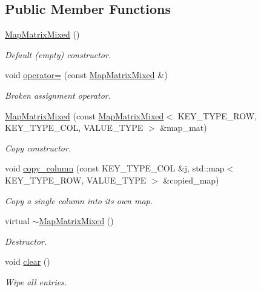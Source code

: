 \subsection*{Public Member Functions}
\begin{DoxyCompactItemize}
\item 
\hyperlink{classoomph_1_1MapMatrixMixed_a51d284e72805320fe36239f5d33e2973}{Map\+Matrix\+Mixed} ()
\begin{DoxyCompactList}\small\item\em Default (empty) constructor. \end{DoxyCompactList}\item 
void \hyperlink{classoomph_1_1MapMatrixMixed_a5a52484fc1b32bcbda6a198de2bd83cb}{operator=} (const \hyperlink{classoomph_1_1MapMatrixMixed}{Map\+Matrix\+Mixed} \&)
\begin{DoxyCompactList}\small\item\em Broken assignment operator. \end{DoxyCompactList}\item 
\hyperlink{classoomph_1_1MapMatrixMixed_ae510212b296340607ddce4083b3ed36a}{Map\+Matrix\+Mixed} (const \hyperlink{classoomph_1_1MapMatrixMixed}{Map\+Matrix\+Mixed}$<$ K\+E\+Y\+\_\+\+T\+Y\+P\+E\+\_\+\+R\+OW, K\+E\+Y\+\_\+\+T\+Y\+P\+E\+\_\+\+C\+OL, V\+A\+L\+U\+E\+\_\+\+T\+Y\+PE $>$ \&map\+\_\+mat)
\begin{DoxyCompactList}\small\item\em Copy constructor. \end{DoxyCompactList}\item 
void \hyperlink{classoomph_1_1MapMatrixMixed_a2cd31cfd9771420625c92fc2a3a53210}{copy\+\_\+column} (const K\+E\+Y\+\_\+\+T\+Y\+P\+E\+\_\+\+C\+OL \&j, std\+::map$<$ K\+E\+Y\+\_\+\+T\+Y\+P\+E\+\_\+\+R\+OW, V\+A\+L\+U\+E\+\_\+\+T\+Y\+PE $>$ \&copied\+\_\+map)
\begin{DoxyCompactList}\small\item\em Copy a single column into its own map. \end{DoxyCompactList}\item 
virtual \hyperlink{classoomph_1_1MapMatrixMixed_a7cf0f3eb68c457db64d4bd8213594618}{$\sim$\+Map\+Matrix\+Mixed} ()
\begin{DoxyCompactList}\small\item\em Destructor. \end{DoxyCompactList}\item 
void \hyperlink{classoomph_1_1MapMatrixMixed_ab061e2b557441b3b2a9fee98fe105af2}{clear} ()
\begin{DoxyCompactList}\small\item\em Wipe all entries. \end{DoxyCompactList}\item 

\end{DoxyCompactItemize}
